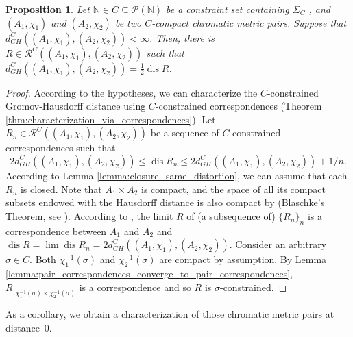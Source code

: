 \documentclass[8pt,a4paper,oneside,english,english]{article}
\theoremstyle{plain}
\theoremstyle
{plain}
\newtheorem{proposition}[theorem]{Proposition}%
\theoremstyle{definition}
\newcommand{\N}{\mathbb{N}}
\newcommand{\GH}{d_{GH}}
\newcommand{\MP}[1]{(A_{#1},\chi_{#1})}
\DeclareMathOperator{\dis}{dis}
\begin{document}
\begin{proposition}\label{prop:correspondence_minimizing_distortion_metric_pairs}
    Let $\N\in C\subseteq\mathcal P(\N)$ be a constraint set containing $\Sigma_C$
    , and $\MP{1}$ and $\MP{2}$ be two $C$-compact chromatic metric pairs. Suppose that $\GH^C(\MP{1},\MP{2})<\infty$. Then, there is $R\in \mathcal R^C(\MP{1},\MP{2})$ such that $\GH^C(\MP{1},\MP{2})=\frac{1}{2}\dis R$. 
\end{proposition}
\begin{proof}
    According to the hypotheses, we can characterize the $C$-constrained Gromov-Hausdorff distance using $C$-constrained correspondences (Theorem \ref{thm:characterization_via_correspondences}). Let $R_n\in\mathcal R^C(\MP{1},\MP{2})$ be a sequence of $C$-constrained correspondences such that 
    \[
        2\GH^C(\MP{1},\MP{2})\leq\dis R_n\leq2\GH^C(\MP{1},\MP{2})+1/n. 
    \]
    According to Lemma \ref{lemma:closure_same_distortion}, we can assume that each $R_n$ is closed. Note that $A_1\times A_2$ is compact, and the space of all its compact subsets endowed with the Hausdorff distance is also compact by (Blaschke's Theorem, see \cite{BurBurIva}). According to \cite{ChoMem_geo}, the limit $R$ of (a subsequence of) $\{R_n\}_n$ is a correspondence between $A_1$ and $A_2$ and $\dis R=\lim\dis R_n=2\GH^C(\MP{1},\MP{2})$. Consider an arbitrary $\sigma\in C$. Both $\chi_1^{-1}(\sigma)$ and $\chi_2^{-1}(\sigma)$ are compact by assumption. By Lemma \ref{lemma:pair_correspondences_converge_to_pair_correspondences}, $R|_{\chi_1^{-1}(\sigma)\times\chi_2^{-1}(\sigma)}$ is a correspondence and so $R$ is $\sigma$-constrained.
\end{proof}

As a corollary, we obtain a characterization of those chromatic metric pairs at distance~$0$.
\end{document}
